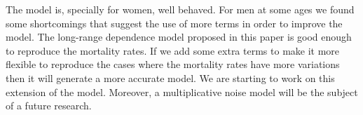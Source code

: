 \documentclass[smallextended]{svjour3}
\begin{document}

The model is, specially for women, well behaved. For men at some ages we found
some shortcomings that suggest the use of more terms in order to improve
the model. The long-range dependence model proposed in this paper is good
enough to reproduce the mortality rates. If we add some extra terms to make it
more flexible to reproduce the cases where the mortality rates have more
variations then it will generate a more accurate model. We are starting to work
on this extension of the model. Moreover, a multiplicative noise model will be
the subject of a future research.\\

{}






\end{document}

